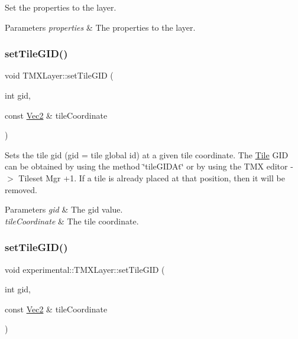 Set the properties to the layer.


\begin{DoxyParams}{Parameters}
{\em properties} & The properties to the layer. \\
\hline
\end{DoxyParams}
\mbox{\label{classexperimental_1_1TMXLayer_a8ed7334bacd08fd9b732b3e893d91f81}} 
\subsubsection{\texorpdfstring{set\+Tile\+G\+I\+D()}{setTileGID()}\hspace{0.1cm}{\footnotesize\ttfamily [1/4]}}
{\footnotesize\ttfamily void T\+M\+X\+Layer\+::set\+Tile\+G\+ID (\begin{DoxyParamCaption}\item[{int}]{gid,  }\item[{const \hyperlink{classVec2}{Vec2} \&}]{tile\+Coordinate }\end{DoxyParamCaption})}

Sets the tile gid (gid = tile global id) at a given tile coordinate. The \hyperlink{structTile}{Tile} G\+ID can be obtained by using the method \char`\"{}tile\+G\+I\+D\+At\char`\"{} or by using the T\+MX editor -\/$>$ Tileset Mgr +1. If a tile is already placed at that position, then it will be removed. 
\begin{DoxyParams}{Parameters}
{\em gid} & The gid value. \\
\hline
{\em tile\+Coordinate} & The tile coordinate. \\
\hline
\end{DoxyParams}
\mbox{\label{classexperimental_1_1TMXLayer_a2e5305f3c43f671bdd66689e1e093a62}} 
\subsubsection{\texorpdfstring{set\+Tile\+G\+I\+D()}{setTileGID()}\hspace{0.1cm}{\footnotesize\ttfamily [2/4]}}
{\footnotesize\ttfamily void experimental\+::\+T\+M\+X\+Layer\+::set\+Tile\+G\+ID (\begin{DoxyParamCaption}\item[{int}]{gid,  }\item[{const \hyperlink{classVec2}{Vec2} \&}]{tile\+Coordinate }\end{DoxyParamCaption})}

